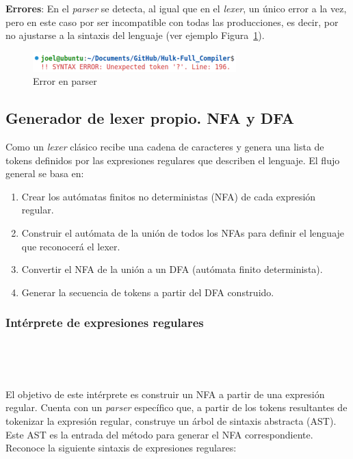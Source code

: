 \documentclass{llncs}
\begin{document}
\textbf{Errores}: En el \textit{parser} se detecta, al igual que en el \textit{lexer}, un único error a la vez, pero en este caso por ser incompatible con todas las producciones, es decir, por no ajustarse a la sintaxis del lenguaje (ver ejemplo Figura~\ref{fig:errores_yacc}).
\begin{figure}[h]
\centering
\includegraphics[width=0.7\textwidth]{images/parser_errors.png}
\caption{Error en parser}
\label{fig:errores_yacc}
\end{figure}

\subsection{Generador de lexer propio. NFA y DFA}

Como un \textit{lexer} clásico recibe una cadena de caracteres y genera una lista de tokens definidos
por las expresiones regulares que describen el lenguaje. El flujo general se basa en:

\begin{enumerate}
    \item Crear los autómatas finitos no deterministas (NFA) de cada expresión regular.
    \item Construir el autómata de la unión de todos los NFAs para definir el lenguaje que reconocerá el lexer.
    \item Convertir el NFA de la unión a un DFA (autómata finito determinista).
    \item Generar la secuencia de tokens a partir del DFA construido.
\end{enumerate}

\subsubsection{Intérprete de expresiones regulares} 

\

\

El objetivo de este intérprete es construir un NFA a partir de una expresión regular. Cuenta con un 
\textit{parser} específico que, a partir de los tokens resultantes de tokenizar la expresión regular,
construye un árbol de sintaxis abstracta (AST). Este AST es la entrada del método para generar el NFA
correspondiente. Reconoce la siguiente sintaxis de expresiones regulares:
\end{document}

